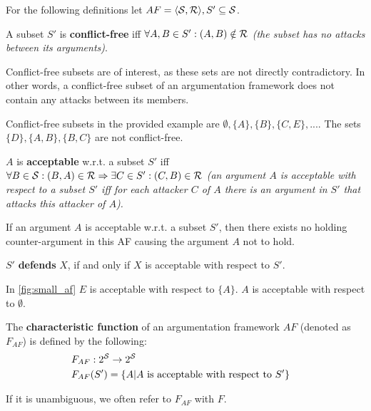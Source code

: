 For the following definitions let $AF=\langle \S, \R \rangle, S' \subseteq \S$.

\begin{definition}
	A subset $S'$ is \textbf{conflict-free} iff $ \forall A, B \in S': (A, B) \notin \R$ \textit{(the subset has no attacks between its arguments)}.
\end{definition}
\begin{remark}
	Conflict-free subsets are of interest, as these sets are not directly contradictory. In other words, a conflict-free subset of an argumentation framework does not contain any attacks between its members.
\end{remark}
\begin{exa}
Conflict-free subsets in the provided example are $\emptyset, \{A\}, \{B\}, \{C, E\}, ...$. The sets $\{D\}, \{A, B\}, \{B, C\}$ are not conflict-free.
\end{exa}

\begin{definition}
$A$ is \textbf{acceptable} w.r.t. a subset $S'$ iff  $\forall B \in \S: (B, A) \in \R \Rightarrow \exists C \in S': (C, B) \in \R$ \textit{(an argument $A$ is acceptable with respect to a subset $S'$ iff for each attacker $C$ of $A$ there is an argument in $S'$ that attacks this attacker of $A$). }
\end{definition}

\begin{remark}
If an argument $A$ is acceptable w.r.t. a subset $S'$, then there exists no holding counter-argument in this \gls{AF} causing the argument $A$ not to hold.
\end{remark}

\begin{lemma}
	$S'$ \textbf{defends} $X$, if and only if $X$ is acceptable with respect to $S'$.
\end{lemma}

\begin{exa}
In  \autoref{fig:small_af} $E$ is acceptable with respect to $\{A\}$. $A$ is acceptable with respect to $\emptyset$. 
\end{exa}


\begin{definition}
The \textbf{characteristic function} of an argumentation framework $AF$ (denoted as $F_{AF}$) is defined by the following:
	\begin{align*}
		&F_{AF}: 2^{\S} \rightarrow 2^\S &\\
		&F_{AF}(S') = \{A | A~\text{is acceptable with respect to}~S'\} &
	\end{align*}
\end{definition}
\begin{notation}
	If it is unambiguous, we often refer to $F_{AF}$ with $F$. 
\end{notation}


